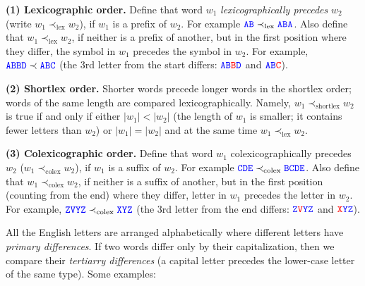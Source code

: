 \documentclass[11pt]{article}
\begin{document}
\vspace{5pt}
{\bf (1) Lexicographic order.} Define that word $w_1$ {\em lexicographically precedes} $w_2$ (write $w_1 \prec_{\text{lex}} w_2$), 
if $w_1$ is a prefix of $w_2$. For example $\textcolor{blue}{\mathtt{AB}} \prec_{\text{lex}} \textcolor{blue}{\mathtt{ABA}}$. 
Also define that $w_1 \prec_{\text{lex}} w_2$, if neither is a prefix of another, but 
in the first position where they differ, the symbol in $w_1$ precedes the symbol in $w_2$. 
For example, $\textcolor{blue}{\mathtt{ABBD}} \prec \textcolor{blue}{\mathtt{ABC}}$
(the 3rd letter from the start differs: $\textcolor{blue}{\mathtt{AB}}\textcolor{red}{\mathtt{B}}\textcolor{blue}{\mathtt{D}}$
and $\textcolor{blue}{\mathtt{AB}}\textcolor{red}{\mathtt{C}}$).

\vspace{5pt}
{\bf (2) Shortlex order.}  Shorter words precede longer words in the shortlex order; words of the 
same length are compared lexicographically. Namely, 
$w_1 \prec_{\text{shortlex}} w_2$ is true if and only if either $|w_1| < |w_2|$ (the length of $w_1$ is smaller; it contains
fewer letters than $w_2$) or $|w_1| = |w_2|$ and at the same time $w_1 \prec_{\text{lex}} w_2$. 

\vspace{5pt}
{\bf (3) Colexicographic order.} Define that word $w_1$ colexicographically precedes $w_2$ ($w_1 \prec_{\text{colex}} w_2$), 
if $w_1$ is a suffix of $w_2$. For example $\textcolor{blue}{\mathtt{CDE}} \prec_{\text{colex}} \textcolor{blue}{\mathtt{BCDE}}$. 
Also define that $w_1 \prec_{\text{colex}} w_2$, if neither is a suffix of another, but 
in the first position (counting from the end) where they differ, letter in $w_1$ precedes the letter in $w_2$. 
For example, $\textcolor{blue}{\mathtt{ZVYZ}} \prec_{\text{colex}} \textcolor{blue}{\mathtt{XYZ}}$
(the 3rd letter from the end differs: 
$\textcolor{blue}{\mathtt{Z}}\textcolor{red}{\mathtt{V}}\textcolor{blue}{\mathtt{YZ}}$ and 
$\textcolor{red}{\mathtt{X}}\textcolor{blue}{\mathtt{YZ}}$).


\vspace{10pt}
All the English letters are arranged alphabetically where 
different letters have {\em primary differences}. 
If two words differ only by their capitalization, then we compare their 
{\em tertiarry differences} (a capital letter
precedes the lower-case letter of the same type). Some examples: 
\end{document}
